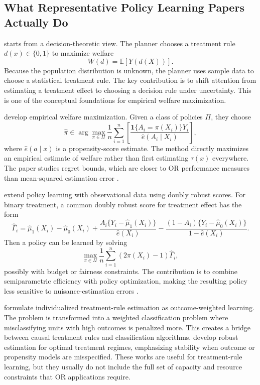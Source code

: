 \documentclass[11pt]{article}
\begin{document}
\subsection{What Representative Policy Learning Papers Actually Do}

\citet{manski2004statistical} starts from a decision-theoretic view. The planner chooses a treatment rule $d(x)\in\{0,1\}$ to maximize welfare
\[
    W(d)=\mathbb{E}[Y(d(X))].
\]
Because the population distribution is unknown, the planner uses sample data to choose a statistical treatment rule. The key contribution is to shift attention from estimating a treatment effect to choosing a decision rule under uncertainty. This is one of the conceptual foundations for empirical welfare maximization.

\citet{kitagawa2018treated} develop empirical welfare maximization. Given a class of policies $\Pi$, they choose
\[
    \hat{\pi}
    \in
    \arg\max_{\pi\in\Pi}
    \frac{1}{n}\sum_{i=1}^{n}
    \left[
    \frac{\mathbf{1}\{A_i=\pi(X_i)\}Y_i}{\hat{e}(A_i\mid X_i)}
    \right],
\]
where $\hat{e}(a\mid x)$ is a propensity-score estimate. The method directly maximizes an empirical estimate of welfare rather than first estimating $\tau(x)$ everywhere. The paper studies regret bounds, which are closer to OR performance measures than mean-squared estimation error \citep{kitagawa2018treated}.

\citet{athey2021policy} extend policy learning with observational data using doubly robust scores. For binary treatment, a common doubly robust score for treatment effect has the form
\[
    \hat{\Gamma}_i
    =
    \hat{\mu}_1(X_i)-\hat{\mu}_0(X_i)
    +
    \frac{A_i\{Y_i-\hat{\mu}_1(X_i)\}}{\hat{e}(X_i)}
    -
    \frac{(1-A_i)\{Y_i-\hat{\mu}_0(X_i)\}}{1-\hat{e}(X_i)}.
\]
Then a policy can be learned by solving
\[
    \max_{\pi\in\Pi}\frac{1}{n}\sum_{i=1}^{n}(2\pi(X_i)-1)\hat{\Gamma}_i,
\]
possibly with budget or fairness constraints. The contribution is to combine semiparametric efficiency with policy optimization, making the resulting policy less sensitive to nuisance-estimation errors \citep{athey2021policy}.

\citet{zhao2012owl} formulate individualized treatment-rule estimation as outcome-weighted learning. The problem is transformed into a weighted classification problem where misclassifying units with high outcomes is penalized more. This creates a bridge between causal treatment rules and classification algorithms. \citet{zhang2012robust} develop robust estimation for optimal treatment regimes, emphasizing stability when outcome or propensity models are misspecified. These works are useful for treatment-rule learning, but they usually do not include the full set of capacity and resource constraints that OR applications require.
\end{document}
